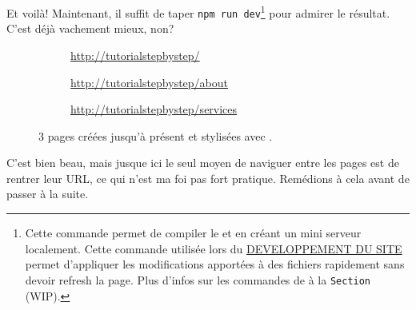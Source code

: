 \documentclass[internal]{nhitec_design}
\begin{document}
\newpage

Et voilà! Maintenant, il suffit de taper \verb|npm run dev|\footnote{Cette commande permet de compiler le \css{} et \js{} en créant un mini serveur localement. Cette commande utilisée lors du \underline{DEVELOPPEMENT DU SITE} permet d'appliquer les modifications apportées à des fichiers rapidement sans devoir refresh la page. Plus d'infos sur les commandes de \vite{} à la \texttt{Section~} (WIP).} pour admirer le résultat. C'est déjà vachement mieux, non?

\begin{figure}[!h]
    \begin{subfigure}[c]{0.73\textwidth}
    \end{subfigure}\hfill
    \begin{subfigure}[c]{0.24\textwidth}
        \caption{\url{http://tutorialstepbystep/}} 
    \end{subfigure}
    \begin{subfigure}[c]{0.73\textwidth}
    \end{subfigure}\hfill
    \begin{subfigure}[c]{0.24\textwidth}
        \caption{\url{http://tutorialstepbystep/about}} 
    \end{subfigure}
    \begin{subfigure}[c]{0.73\textwidth}
    \end{subfigure}\hfill
    \begin{subfigure}[c]{0.24\textwidth}
        \caption{\url{http://tutorialstepbystep/services}} 
    \end{subfigure}
    \caption{3 pages créées jusqu'à présent et stylisées avec \bs{}.}
\end{figure}
C'est bien beau, mais jusque ici le seul moyen de naviguer entre les pages est de rentrer leur URL, ce qui n'est ma foi pas fort pratique. Remédions à cela avant de passer à la suite.
\end{document}

